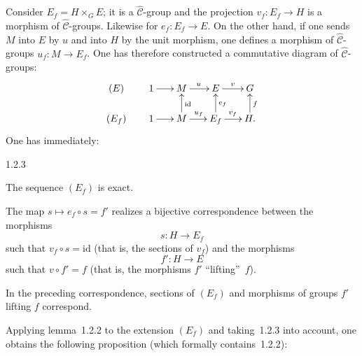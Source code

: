 Consider \(E_{f}=H\times_{G}E\); it is a \(\widehat{\mathcal{C}}\)-group and the
projection \(v_{f}\colon E_{f}\to H\) is a morphism of
\(\widehat{\mathcal{C}}\)-groups. Likewise for \(e_{f}\colon E_{f}\to E\).
On the other hand, if one sends \(M\) into \(E\) by \(u\) and into \(H\) by the
unit morphism, one defines a morphism of \(\widehat{\mathcal{C}}\)-groups
\(u_{f}\colon M\to E_{f}\). One has therefore constructed a commutative
diagram of \(\widehat{\mathcal{C}}\)-groups:
\[
\xymatrix@C=1.7em@R=1.5em{
(E) & 1 \ar[r] & M \ar[r]^{u} & E \ar[r]^{v} & G \\
(E_{f}) & 1 \ar[r]
  & M \ar[u]_{\mathrm{id}} \ar[r]^{u_{f}}
  & E_{f} \ar[u]_{e_{f}} \ar[r]^{v_{f}}
  & H \ar[u]_{f}.
}
\]
One has immediately:

\begin{lemma}{1.2.3}
\label{III.1.2.3}
\begin{enumeratei}
\item The sequence \((E_{f})\) is exact.
\item The map \(s\mapsto e_{f}\circ s=f'\) realizes a bijective
correspondence between the morphisms
\[
s\colon H\longrightarrow E_{f}
\]
such that \(v_{f}\circ s=\mathrm{id}\) (that is, the sections of \(v_{f}\))
and the morphisms
\[
f'\colon H\longrightarrow E
\]
such that \(v\circ f'=f\) (that is, the morphisms \(f'\) ``lifting''~\(f\)).
\item In the preceding correspondence, sections of \((E_{f})\) and morphisms
of groups \(f'\) lifting \(f\) correspond.
\end{enumeratei}
\end{lemma}

Applying lemma~1.2.2 to the extension \((E_{f})\) and taking~1.2.3 into
account, one obtains the following proposition (which formally
contains~1.2.2):

